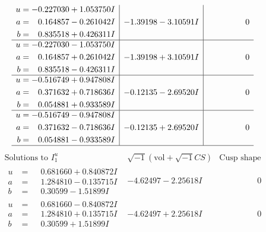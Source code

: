 \documentclass[1p]{elsarticle_modified}
\theoremstyle{definition}
\newcommand{\I}{\sqrt{-1}}
\begin{document}
$$\begin{array}{c|c|c}
\begin{aligned}
u &= -0.227030 + 1.053750 I \\
a &= \phantom{-}0.164857 - 0.261042 I \\
b &= \phantom{-}0.835518 + 0.426311 I\end{aligned}
 & -1.39198 - 3.10591 I & \phantom{-0.000000 } 0 \\ \hline\begin{aligned}
u &= -0.227030 - 1.053750 I \\
a &= \phantom{-}0.164857 + 0.261042 I \\
b &= \phantom{-}0.835518 - 0.426311 I\end{aligned}
 & -1.39198 + 3.10591 I & \phantom{-0.000000 } 0 \\ \hline\begin{aligned}
u &= -0.516749 + 0.947808 I \\
a &= \phantom{-}0.371632 + 0.718636 I \\
b &= \phantom{-}0.054881 + 0.933589 I\end{aligned}
 & -0.12135 - 2.69520 I & \phantom{-0.000000 } 0 \\ \hline\begin{aligned}
u &= -0.516749 - 0.947808 I \\
a &= \phantom{-}0.371632 - 0.718636 I \\
b &= \phantom{-}0.054881 - 0.933589 I\end{aligned}
 & -0.12135 + 2.69520 I & \phantom{-0.000000 } 0\\
 \hline 
 \end{array}$$\newpage$$\begin{array}{c|c|c}  
\text{Solutions to }I^u_{1}& \I (\text{vol} + \sqrt{-1}CS) & \text{Cusp shape}\\
 \hline 
\begin{aligned}
u &= \phantom{-}0.681660 + 0.840872 I \\
a &= \phantom{-}1.284810 - 0.135715 I \\
b &= \phantom{-}0.30599 - 1.51899 I\end{aligned}
 & -4.62497 - 2.25618 I & \phantom{-0.000000 } 0 \\ \hline\begin{aligned}
u &= \phantom{-}0.681660 - 0.840872 I \\
a &= \phantom{-}1.284810 + 0.135715 I \\
b &= \phantom{-}0.30599 + 1.51899 I\end{aligned}
 & -4.62497 + 2.25618 I & \phantom{-0.000000 } 0 \\ \hline\begin{aligned}

\end{aligned}
\end{array}$$
\end{document}
